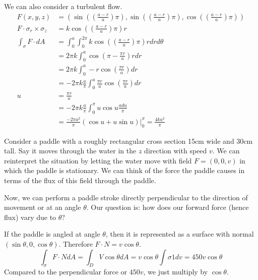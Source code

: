 \documentclass[fleqn,letterpaper]{report}
\begin{document}
\begin{example}
We can also consider a turbulent flow.
\begin{align*}
F(x,y,z) & = \left( 
\sin \left( \left( \frac{a-r}{a} \right) \pi \right), 
\sin \left( \left( \frac{a-r}{a} \right) \pi \right), 
\cos \left( \left( \frac{a-r}{a} \right) \pi \right) \right)
\\
F \cdot \sigma_r \times \sigma_z & = k \cos \left( \left(
\frac{a-r}{a} \right) \pi \right) r \\
\int_\sigma F \cdot dA & = \int_0^a \int_0^{2\pi}
k \cos \left( \left( \frac{a-r}{a} \right) \pi \right) r dr
d\theta \\
& = 2\pi k \int_0^a \cos \left( \pi - \frac{\pi r}{a} \right)
r dr \\
& = 2\pi k\int_0^a -r \cos \left( \frac{\pi r}{a} \right) dr
\\
& = -2\pi k \frac{a}{\pi} \int_0^a \frac{\pi r}{a} \cos \left(
\frac{\pi r}{a} \right) dr \\
u & = \frac{\pi r}{a} \\
& = -2\pi k \frac{a}{\pi} \int_0^{\pi} u \cos u \frac{a du }{\pi}
\\
& = \frac{-2\pi a^2}{\pi} \left( \cos u + u \sin u
\right) \bigg|_0^{\pi} = \frac{4k a^2}{\pi}
\end{align*}
\end{example}

\begin{example}
Consider a paddle with a roughly
rectangular cross section 15cm wide and 30cm tall. Say it
moves through the water in the $z$ direction with speed $v$.
We can reinterpret the situation by letting the water move
with field $F = (0,0,v)$ in which the paddle is stationary.
We can think of the force the paddle causes in terms of
the flux of this field through the paddle.

Now, we can perform a paddle stroke directly perpendicular to
the direction of movement or at an angle $\theta$. Our
question is: how does our forward force (hence flux) vary due
to $\theta$?

If the paddle is angled at angle $\theta$, then it is
represented as a 
surface with normal $(\sin \theta, 0, \cos \theta)$.
Therefore $F \cdot N = v \cos \theta$. 
\begin{equation*}
\int_\sigma F \cdot N dA = \int_D V \cos \theta dA = v \cos
\theta \int \sigma 1 dv = 450 v \cos \theta
\end{equation*}
Compared to the perpendicular force or $450v$, we just
multiply by $\cos \theta$.
\end{example}
\end{document}
